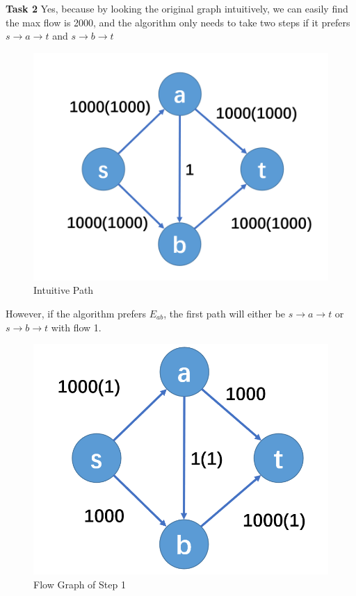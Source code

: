 \documentclass[a4paper]{article}
\begin{document}
\textbf{Task 2}
Yes, because by looking the original graph intuitively, we can easily find the max flow is 2000, and the algorithm only needs to take two steps if it prefers $s\rightarrow a\rightarrow t$ and $s\rightarrow b\rightarrow t$
\begin{figure}[H]
    \centering
    \includegraphics[scale=0.25]{P6.png}
    \caption{Intuitive Path}
\end{figure}
However, if the algorithm prefers $E_{ab}$, the first path will either be $s\rightarrow a\rightarrow t$ or $s\rightarrow b\rightarrow t$ with flow 1. 
\begin{figure}[H]
    \centering
    \includegraphics[scale=0.25]{P7.png}
    \caption{Flow Graph of Step 1}
\end{figure}
\end{document}
